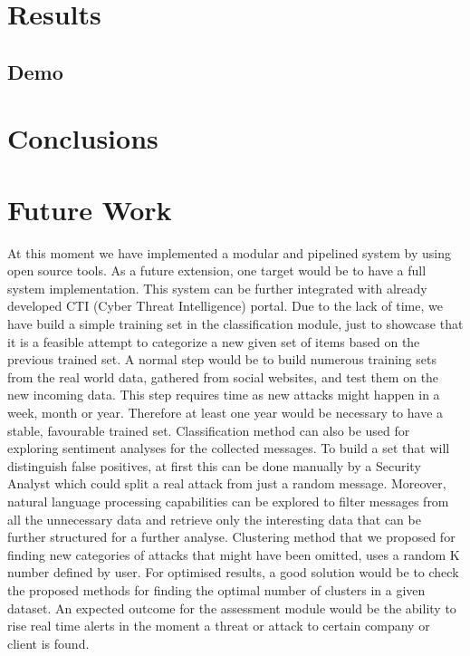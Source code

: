 \documentclass[12pt]{article}
\begin{document}
\section{Results}
\subsection{Demo}
\newpage
\section{Conclusions}

\newpage
\section{Future Work}

At this moment we have implemented a modular and pipelined system by using open source tools. As a future extension, one target would be to have a full system implementation. This system can be further integrated with already developed CTI (Cyber Threat Intelligence) portal. Due to the lack of time, we have build a simple training set in the classification module, just to showcase that it is a feasible attempt to categorize a new given set of items based on the previous trained set. A normal step would be to build numerous training sets from the real world data, gathered from social websites, and test them on the new incoming data. This step requires time as new attacks might happen in a week, month or year. Therefore at least one year would be necessary to have a stable, favourable trained set. Classification method can also be used for exploring sentiment analyses for the collected messages. To build a set that will distinguish false positives, at first this can be done manually by a Security Analyst which could split a real attack from just a random message. Moreover, natural language processing capabilities can be explored to filter messages from all the unnecessary data and retrieve only the interesting data that can be further structured for a further analyse. Clustering method that we proposed for finding new categories of attacks that might have been omitted, uses a random K number defined by user. For optimised results, a good solution would be to check the proposed methods for finding the optimal number of clusters in a given dataset. An expected outcome for the assessment module would be the ability to rise real time alerts in the moment a threat or attack to certain company or client is found.
\end{document}
